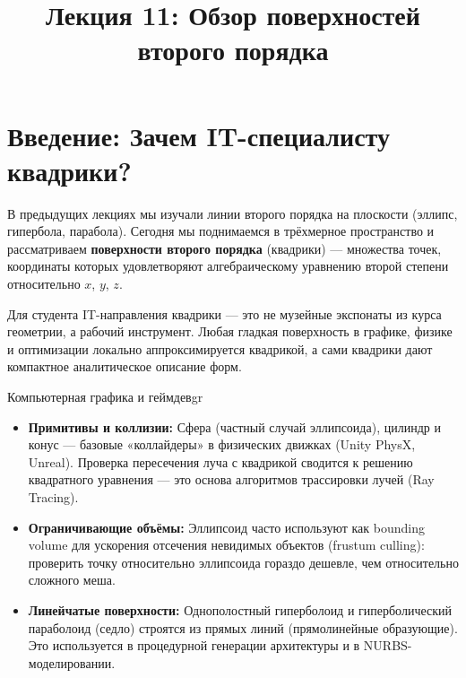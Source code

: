 \documentclass[12pt,a4paper]{article}
\title{Лекция 11: Обзор поверхностей второго порядка}
\author{}
\date{}
\begin{document}
\maketitle
\thispagestyle{fancy}

\section*{Введение: Зачем IT-специалисту квадрики?}

В предыдущих лекциях мы изучали линии второго порядка на плоскости
(эллипс, гипербола, парабола). Сегодня мы поднимаемся в трёхмерное
пространство и рассматриваем \textbf{поверхности второго порядка}
(квадрики) — множества точек, координаты которых удовлетворяют
алгебраическому уравнению второй степени относительно $x$, $y$, $z$.

Для студента IT-направления квадрики — это не музейные экспонаты из
курса геометрии, а рабочий инструмент. Любая гладкая поверхность в
графике, физике и оптимизации локально аппроксимируется квадрикой,
а сами квадрики дают компактное аналитическое описание форм.

\begin{remarkIT}{Компьютерная графика и геймдев}{gr}
  \begin{itemize}
    \item \textbf{Примитивы и коллизии:} Сфера (частный случай
      эллипсоида), цилиндр и конус — базовые «коллайдеры» в физических
      движках (Unity PhysX, Unreal). Проверка пересечения луча с
      квадрикой сводится к решению квадратного уравнения — это
      основа алгоритмов трассировки лучей (Ray Tracing).
    \item \textbf{Ограничивающие объёмы:} Эллипсоид часто используют
      как bounding volume для ускорения отсечения невидимых объектов
      (frustum culling): проверить точку относительно эллипсоида
      гораздо дешевле, чем относительно сложного меша.
    \item \textbf{Линейчатые поверхности:} Однополостный гиперболоид
      и гиперболический параболоид (седло) строятся из прямых линий
      (прямолинейные образующие). Это используется в процедурной
      генерации архитектуры и в NURBS-моделировании.
  \end{itemize}
\end{remarkIT}
\end{document}

